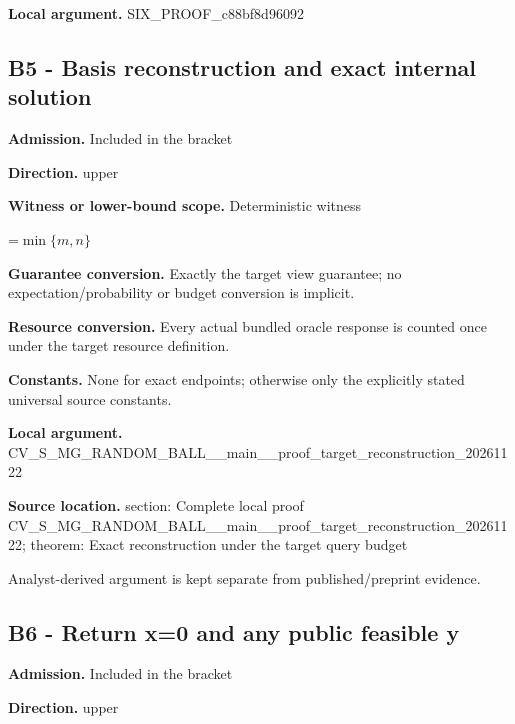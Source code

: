 \documentclass[10pt,a4paper]{article}
\newcommand{\AtlasMath}[1]{\par\begingroup\centering\setbox0=\hbox{$\displaystyle #1$}\ifdim\wd0>1.4\linewidth\typeout{ATLAS WIDE FORMULA: \the\wd0}\fi\ifdim\wd0>\linewidth\resizebox{\linewidth}{!}{\box0}\else\box0\fi\par\endgroup}
\begin{document}
\textbf{Local argument.} SIX\_PROOF\_c88bf8d96092



\subsection{B5 - Basis reconstruction and exact internal solution}


\textbf{Admission.} Included in the bracket



\textbf{Direction.} upper



\textbf{Witness or lower-bound scope.} Deterministic witness



\AtlasMath{\min\{m,n\}}


\textbf{Guarantee conversion.} Exactly the target view guarantee; no expectation/probability or budget conversion is implicit.



\textbf{Resource conversion.} Every actual bundled oracle response is counted once under the target resource definition.



\textbf{Constants.} None for exact endpoints; otherwise only the explicitly stated universal source constants.



\textbf{Local argument.} CV\_S\_MG\_RANDOM\_BALL\_\_mai\allowbreak{}n\_\_proof\_target\_reconstr\allowbreak{}uction\_20261122



\textbf{Source location.}  section: Complete local proof CV\_S\_MG\_RANDOM\_BALL\_\_mai\allowbreak{}n\_\_proof\_target\_reconstr\allowbreak{}uction\_20261122; theorem: Exact reconstruction under the target query budget



Analyst-derived argument is kept separate from published/preprint evidence.



\subsection{B6 - Return x=0 and any public feasible y}


\textbf{Admission.} Included in the bracket



\textbf{Direction.} upper
\end{document}
